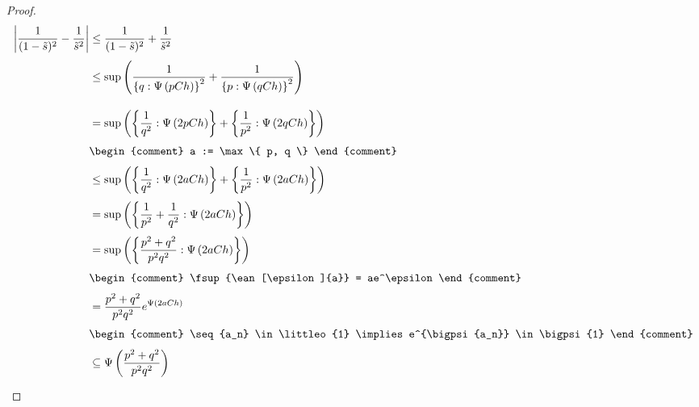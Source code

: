 \begin{proof}
  \begin{align}
    \abs{\frac 1{(1-\tilde s)^2}-\frac 1{\tilde s^2}} & \le \frac{1}{(1-\tilde s)^2} + \frac{1}{\tilde s^2} \nl
    & \le \fsup{\frac 1{\ean[\bigpsi{pCh}]{q}^2} + \frac 1{\ean[\bigpsi{qCh}]{p}^2}} \bnl
    & = \fsup{\ean[\bigpsi{2pCh}]{\frac 1{q^2}} + \ean[\bigpsi{2qCh}]{\frac 1{p^2}}} \nl
    &
    \begin{comment}
      a := \max\{ p, q \}
    \end{comment} \nl
    & \le \fsup{\ean[\bigpsi{2aCh}]{\frac{1}{q^2}} + \ean[\bigpsi{2aCh}]{\frac 1{p^2}}} \nl
    & = \fsup{\ean[\bigpsi{2aCh}]{\frac 1{p^2}+\frac 1{q^2}}} \nl
    & = \fsup{\ean[\bigpsi{2aCh}]{\frac {p^2+q^2}{p^2q^2}}} \nl
    &
    \begin{comment}
      \fsup{\ean[\epsilon]{a}} = ae^\epsilon
    \end{comment} \nl
    & = \frac {p^2+q^2}{p^2q^2} e^{\bigpsi{2aCh}} \nl
    & \begin{comment}
      \seq{a_n} \in \littleo{1} \implies e^{\bigpsi{a_n}} \in \bigpsi{1}
    \end{comment} \nl
    & \subseteq \bigpsi{\frac {p^2+q^2}{p^2q^2}} \nl
  \end{align}


\end{proof}
